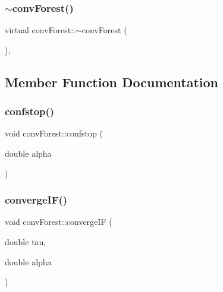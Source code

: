 \mbox{\label{classconvForest_a85d5cb4ec991893853acf4be144cdf52}} 
\subsubsection{\texorpdfstring{$\sim$conv\+Forest()}{~convForest()}}
{\footnotesize\ttfamily virtual conv\+Forest\+::$\sim$conv\+Forest (\begin{DoxyParamCaption}{ }\end{DoxyParamCaption})\hspace{0.3cm}{\ttfamily [virtual]}, {\ttfamily [default]}}



\subsection{Member Function Documentation}
\mbox{\label{classconvForest_a4a20fbcf944458fbbc62400bc0bb2de7}} 
\subsubsection{\texorpdfstring{confstop()}{confstop()}}
{\footnotesize\ttfamily void conv\+Forest\+::confstop (\begin{DoxyParamCaption}\item[{double}]{alpha }\end{DoxyParamCaption})}

\mbox{\label{classconvForest_acf0da12a09b3aa4323c4dc3fe6f1be56}} 
\subsubsection{\texorpdfstring{converge\+I\+F()}{convergeIF()}}
{\footnotesize\ttfamily void conv\+Forest\+::converge\+IF (\begin{DoxyParamCaption}\item[{double}]{tau,  }\item[{double}]{alpha }\end{DoxyParamCaption})}

